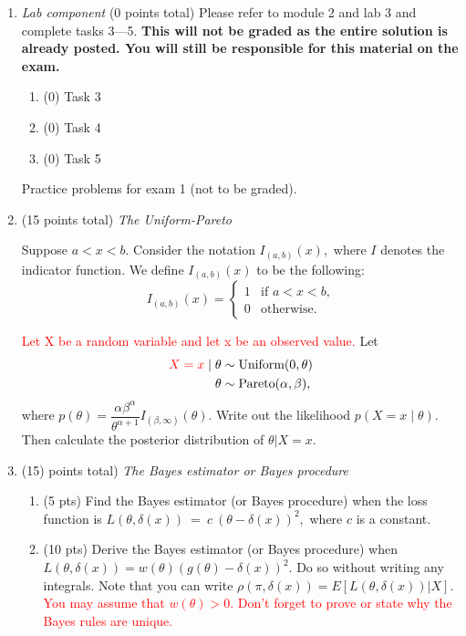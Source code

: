 \documentclass{article}
\begin{document}
\begin{enumerate}
\item {\em Lab component} 
  (0 points total) Please refer to module 2 and lab 3 and complete tasks 3---5. \textbf{This will not be graded as the entire solution is already posted. You will still be responsible for this material on the exam.}
  \begin{enumerate}
  \item (0) Task 3
  \item (0) Task 4
  \item (0) Task 5
  \end{enumerate}
  
  \newpage
  
Practice problems for exam 1 (not to be graded).   
  
\item (15 points total) {\em The Uniform-Pareto}

Suppose $a < x < b.$ Consider the notation
$I_{(a,b)}(x),$ where $I$ denotes the indicator function. We define $I_{(a,b)}(x)$ to be the following:
$$
I_{(a,b)}(x)=
\begin{cases} 
1 & \text{if $a < x < b$,}
\\
0 &\text{otherwise.}
\end{cases}
$$

\textcolor{red}{Let X be a random variable and let x be an observed value.}
Let 
\begin{align*}
\textcolor{red}{X=x} \mid \theta &\sim \text{Uniform}(0,\theta)\\
\theta &\sim \text{Pareto}(\alpha,\beta),
\end{align*}
where $p(\theta) = \dfrac{\alpha \beta^\alpha}{\theta^{\alpha +1}}I_{(\beta,\infty)}(\theta).$
Write out the likelihood $p(X=x\mid \theta).$ Then calculate the posterior distribution of $\theta|X=x.$  
  
  
\item (15)  points total) {\em The Bayes estimator or Bayes procedure}
\begin{enumerate}
\item (5 pts) Find the Bayes estimator (or Bayes procedure) when the loss function is  $L(\theta, \delta(x))~=~c~(\theta-\delta(x))^2,$ where $c$ is a constant. 
\item (10 pts) Derive the Bayes estimator (or Bayes procedure) when $L(\theta, \delta(x)) = w(\theta) (g(\theta)-\delta(x))^2.$ Do so without writing any integrals. Note that you can write $\rho(\pi,\delta(x)) =  E[L(\theta,\delta(x))|X].$  \textcolor{red}{You may assume that $w(\theta) > 0.$} \textcolor{red}{Don't forget to prove or state why the Bayes rules are unique.}
\end{enumerate}


\end{enumerate}
\end{document}
